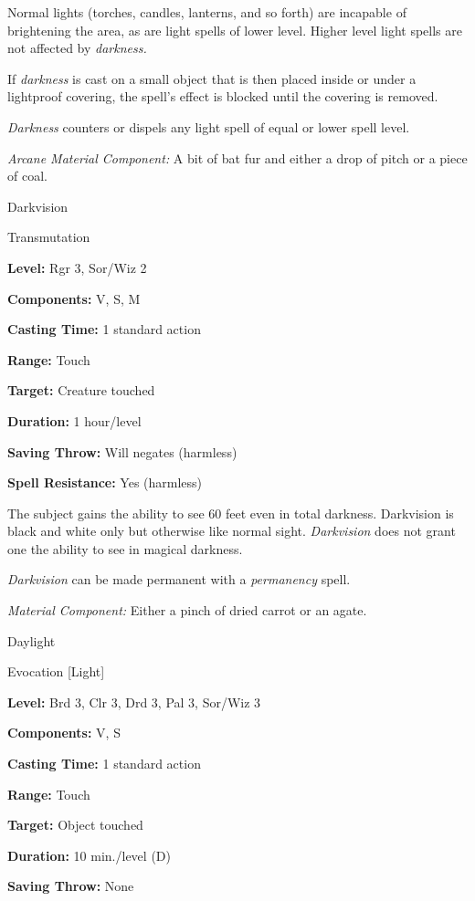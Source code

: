 \documentclass{article}
\begin{document}
Normal lights (torches, candles, lanterns, and so forth) are incapable of brightening 
the area, as are light spells of lower level. Higher level light spells are not 
affected by \textit{darkness.}

If \textit{darkness }is cast on a small object that is then placed inside or under 
a lightproof covering, the spell's effect is blocked until the covering is removed.

\textit{Darkness }counters or dispels any light spell of equal or lower spell level.

\textit{Arcane Material Component: }A bit of bat fur and either a drop of pitch 
or a piece of coal.

\vspace{12pt}
Darkvision

Transmutation

\textbf{Level:} Rgr 3, Sor/Wiz 2

\textbf{Components:} V, S, M

\textbf{Casting Time:} 1 standard action

\textbf{Range:} Touch

\textbf{Target:} Creature touched

\textbf{Duration:} 1 hour/level

\textbf{Saving Throw: }Will negates (harmless)

\textbf{Spell Resistance:} Yes (harmless)

The subject gains the ability to see 60 feet even in total darkness. Darkvision 
is black and white only but otherwise like normal sight. \textit{Darkvision }does 
not grant one the ability to see in magical darkness.

\textit{Darkvision }can be made permanent with a \textit{permanency }spell.

\textit{Material Component: }Either a pinch of dried carrot or an agate.

\vspace{12pt}
Daylight

Evocation [Light]

\textbf{Level:} Brd 3, Clr 3, Drd 3, Pal 3, Sor/Wiz 3

\textbf{Components:} V, S

\textbf{Casting Time:} 1 standard action

\textbf{Range:} Touch

\textbf{Target:} Object touched

\textbf{Duration:} 10 min./level (D)

\textbf{Saving Throw:} None
\end{document}
